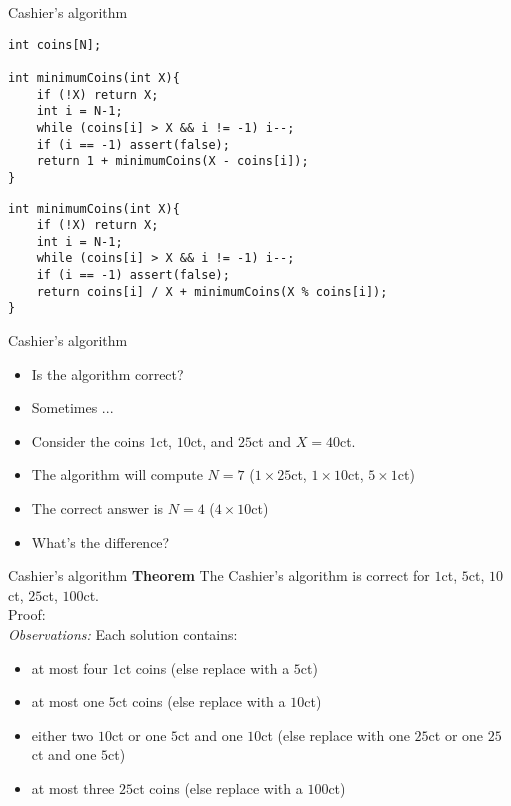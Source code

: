 \documentclass[12pt,t]{beamer}
\newcommand{\bi}{\begin{itemize}}
\newcommand{\ei}{\end{itemize}}
\begin{document}
\begin{frame}[fragile]{Cashier's algorithm}
\begin{verbatim}
int coins[N];

int minimumCoins(int X){
    if (!X) return X;
    int i = N-1;
    while (coins[i] > X && i != -1) i--;
    if (i == -1) assert(false);
    return 1 + minimumCoins(X - coins[i]);
}
    \end{verbatim}
    \vspace{10pt}
    \vspace{10pt}
   \pause \pause
\begin{verbatim}
int minimumCoins(int X){
    if (!X) return X;
    int i = N-1;
    while (coins[i] > X && i != -1) i--;
    if (i == -1) assert(false);
    return coins[i] / X + minimumCoins(X % coins[i]);
}
    \end{verbatim}
    \vspace{10pt}
\end{frame}


\begin{frame}[fragile]{Cashier's algorithm}
    \vspace{30pt}
    \bi
        \item Is the algorithm correct?
        \item<2-> Sometimes ...
        \item<3-> Consider the coins $1$ct, $10$ct, and $25$ct and $X = 40$ct.
        \item<3-> The algorithm will compute $N=7$ ($1\times25$ct, $1\times10$ct, $5\times1$ct)
        \item<3-> The correct answer is $N=4$ ($4\times10$ct)
        \item<4-> What's the difference?
    \ei
\end{frame}

\begin{frame}[fragile]{Cashier's algorithm}
    \vspace{10pt}
    {\textbf{Theorem} The Cashier's algorithm is correct for $1$ct, $5$ct, $10$ct, $25$ct, $100$ct.}\\[\baselineskip]
    {\color{hilight}Proof:}\\[\baselineskip]
    \textit{Observations:} Each solution contains:
    \begin{itemize}
         \item at most four $1$ct coins (else replace with a $5$ct)
         \item at most one $5$ct coins (else replace with a $10$ct)
         \item either two $10$ct or one $5$ct and one $10$ct (else replace with one $25$ct or one $25$ct and one $5$ct)
         \item at most three $25$ct coins (else replace with a $100$ct)
    \end{itemize}
\end{frame}
\end{document}
